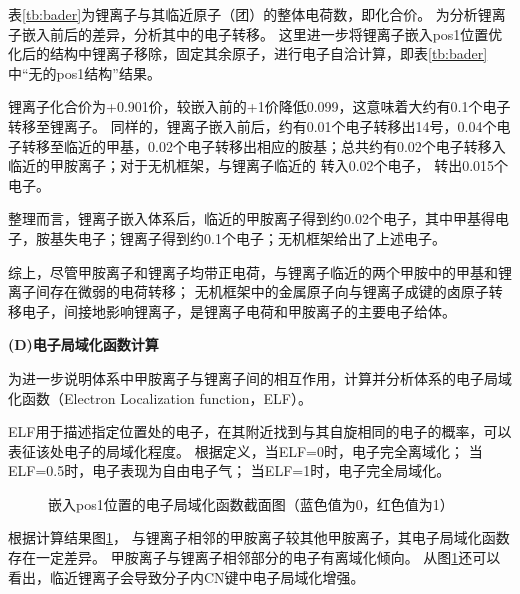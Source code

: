 表\ref{tb:bader}为锂离子与其临近原子（团）的整体电荷数，即化合价。
为分析锂离子嵌入前后的差异，分析其中的电子转移。
这里进一步将锂离子嵌入pos1位置优化后的结构中锂离子移除，固定其余原子，进行电子自洽计算，即表\ref{tb:bader}中“无的pos1结构”结果。

锂离子化合价为+0.901价，较嵌入前的+1价降低0.099，这意味着大约有0.1个电子转移至锂离子。
同样的，锂离子嵌入前后，约有0.01个电子转移出14号，0.04个电子转移至临近的甲基，0.02个电子转移出相应的胺基；总共约有0.02个电子转移入临近的甲胺离子；对于无机框架，与锂离子临近的 转入0.02个电子， 转出0.015个电子。

整理而言，锂离子嵌入体系后，临近的甲胺离子得到约0.02个电子，其中甲基得电子，胺基失电子；锂离子得到约0.1个电子；无机框架给出了上述电子。


综上，尽管甲胺离子和锂离子均带正电荷，与锂离子临近的两个甲胺中的甲基和锂离子间存在微弱的电荷转移；
无机框架中的金属原子向与锂离子成键的卤原子转移电子，间接地影响锂离子，是锂离子电荷和甲胺离子的主要电子给体。


{\bf (D)电子局域化函数计算}

为进一步说明体系中甲胺离子与锂离子间的相互作用，计算并分析体系的电子局域化函数（Electron Localization function，ELF）。

ELF用于描述指定位置处的电子，在其附近找到与其自旋相同的电子的概率，可以表征该处电子的局域化程度。
根据定义，当ELF=0时，电子完全离域化；
当ELF=0.5时，电子表现为自由电子气；
当ELF=1时，电子完全局域化。

\begin{figure}[htbp]
    \centering
    \caption{嵌入pos1位置的电子局域化函数截面图（蓝色值为0，红色值为1）}
    \label{fig:111-pos1-elf}
\end{figure}

根据计算结果图\ref{fig:111-pos1-elf}，
与锂离子相邻的甲胺离子较其他甲胺离子，其电子局域化函数存在一定差异。
甲胺离子与锂离子相邻部分的电子有离域化倾向。
从图\ref{fig:111-pos1-elf}还可以看出，临近锂离子会导致分子内CN键中电子局域化增强。


